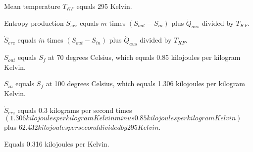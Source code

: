Mean temperature \( T_{KF} \) equals 295 Kelvin.  

Entropy production \( \dot{S}_{erz} \) equals \( \dot{m} \) times \( (S_{out} - S_{in}) \) plus \( \dot{Q}_{aus} \) divided by \( T_{KF} \).  

\( \dot{S}_{erz} \) equals \( \dot{m} \) times \( (S_{out} - S_{in}) \) plus \( \dot{Q}_{aus} \) divided by \( T_{KF} \).  

\( S_{out} \) equals \( S_f \) at 70 degrees Celsius, which equals 0.85 kilojoules per kilogram Kelvin.  

\( S_{in} \) equals \( S_f \) at 100 degrees Celsius, which equals 1.306 kilojoules per kilogram Kelvin.  

\( \dot{S}_{erz} \) equals 0.3 kilograms per second times \( (1.306 kilojoules per kilogram Kelvin minus 0.85 kilojoules per kilogram Kelvin) \) plus \( 62.432 kilojoules per second divided by 295 Kelvin \).  

Equals 0.316 kilojoules per Kelvin.